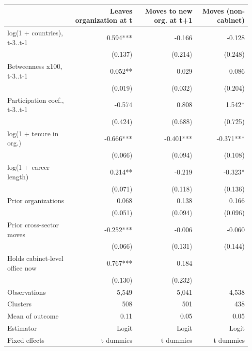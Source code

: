 \begin{tabular}{lrrr}
\toprule
 & Leaves organization at t & Moves to new org. at t+1 & Moves (non-cabinet) \\
\midrule
log(1 + countries), t-3..t-1 & 0.594*** & -0.166 & -0.128 \\
 & (0.137) & (0.214) & (0.248) \\
Betweenness x100, t-3..t-1 & -0.052** & -0.029 & -0.086 \\
 & (0.019) & (0.032) & (0.204) \\
Participation coef., t-3..t-1 & -0.574 & 0.808 & 1.542* \\
 & (0.424) & (0.688) & (0.725) \\
log(1 + tenure in org.) & -0.666*** & -0.401*** & -0.371*** \\
 & (0.066) & (0.094) & (0.108) \\
log(1 + career length) & 0.214** & -0.219 & -0.323* \\
 & (0.071) & (0.118) & (0.136) \\
Prior organizations & 0.068 & 0.138 & 0.166 \\
 & (0.051) & (0.094) & (0.096) \\
Prior cross-sector moves & -0.252*** & -0.006 & -0.060 \\
 & (0.066) & (0.131) & (0.144) \\
Holds cabinet-level office now & 0.767*** & 0.184 &  \\
 & (0.130) & (0.232) &  \\
Observations & 5,549 & 5,041 & 4,538 \\
Clusters & 508 & 501 & 438 \\
Mean of outcome & 0.11 & 0.05 & 0.05 \\
Estimator & Logit & Logit & Logit \\
Fixed effects & t dummies & t dummies & t dummies \\
\bottomrule
\end{tabular}
\par{}
